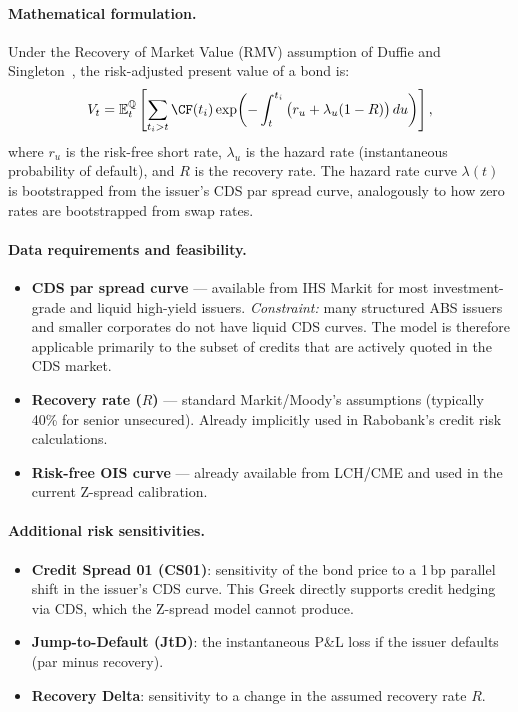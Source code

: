 \documentclass[reviewdoc]{pmv_report}  %
\begin{document}
\paragraph{Mathematical formulation.}
Under the Recovery of Market Value (RMV) assumption of Duffie and Singleton~\cite{Scho04}, the risk-adjusted present value of a bond is:
\begin{equation}\label{eq:intensity}
  V_t = \mathbb{E}^{\mathbb{Q}}_t \left[ \sum_{t_i > t} \CF(t_i) \exp\!\left( -\int_t^{t_i} \big(r_u + \lambda_u (1 - R)\big)\, du \right) \right],
\end{equation}
where $r_u$ is the risk-free short rate, $\lambda_u$ is the hazard rate (instantaneous probability of default), and $R$ is the recovery rate.
The hazard rate curve $\lambda(t)$ is bootstrapped from the issuer's CDS par spread curve, analogously to how zero rates are bootstrapped from swap rates.

\paragraph{Data requirements and feasibility.}
\begin{itemize}
  \item \textbf{CDS par spread curve} --- available from IHS Markit for most investment-grade and liquid high-yield issuers.
    \emph{Constraint:} many structured ABS issuers and smaller corporates do not have liquid CDS curves.
    The model is therefore applicable primarily to the subset of credits that are actively quoted in the CDS market.
  \item \textbf{Recovery rate ($R$)} --- standard Markit/Moody's assumptions (typically 40\% for senior unsecured).
    Already implicitly used in Rabobank's credit risk calculations.
  \item \textbf{Risk-free OIS curve} --- already available from LCH/CME and used in the current Z-spread calibration.
\end{itemize}

\paragraph{Additional risk sensitivities.}
\begin{itemize}
  \item \textbf{Credit Spread 01 (CS01)}: sensitivity of the bond price to a 1\,bp parallel shift in the issuer's CDS curve.
    This Greek directly supports credit hedging via CDS, which the Z-spread model cannot produce.
  \item \textbf{Jump-to-Default (JtD)}: the instantaneous P\&L loss if the issuer defaults (par minus recovery).
  \item \textbf{Recovery Delta}: sensitivity to a change in the assumed recovery rate $R$.
\end{itemize}
\end{document}
